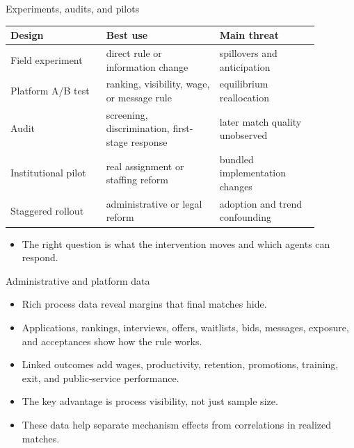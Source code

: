 \documentclass[aspectratio=169,11pt]{beamer}
\begin{document}
\begin{frame}{Experiments, audits, and pilots}
\small
\begin{tabular}{p{0.27\linewidth} p{0.32\linewidth} p{0.29\linewidth}}
\toprule
Design & Best use & Main threat \\
\midrule
Field experiment & direct rule or information change & spillovers and anticipation \\
Platform A/B test & ranking, visibility, wage, or message rule & equilibrium reallocation \\
Audit & screening, discrimination, first-stage response & later match quality unobserved \\
Institutional pilot & real assignment or staffing reform & bundled implementation changes \\
Staggered rollout & administrative or legal reform & adoption and trend confounding \\
\bottomrule
\end{tabular}
\vspace{0.2cm}
\begin{itemize}
    \item The right question is what the intervention moves and which agents can respond.
\end{itemize}
\end{frame}

\begin{frame}{Administrative and platform data}
\begin{itemize}
    \item Rich process data reveal margins that final matches hide.
    \item Applications, rankings, interviews, offers, waitlists, bids, messages, exposure, and acceptances show how the rule works.
    \item Linked outcomes add wages, productivity, retention, promotions, training, exit, and public-service performance.
    \item The key advantage is process visibility, not just sample size.
    \item These data help separate mechanism effects from correlations in realized matches.
\end{itemize}
\end{frame}
\end{document}
